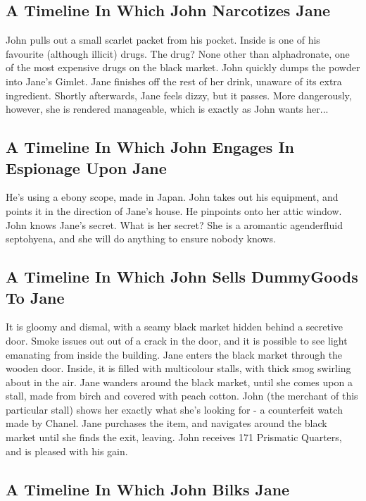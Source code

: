 \documentclass{article}
\begin{document}
\subsection{A Timeline In Which John Narcotizes Jane}


John pulls out a small scarlet packet from his pocket. Inside is one of his favourite (although illicit) drugs.
The drug? None other than alphadronate, one of the most expensive drugs on the black market.
John quickly dumps the powder into Jane's Gimlet.
Jane finishes off the rest of her drink, unaware of its extra ingredient.
Shortly afterwards, Jane feels dizzy, but it passes.
More dangerously, however, she is rendered manageable, which is exactly as John wants her...
\subsection{A Timeline In Which John Engages In Espionage Upon Jane}


He's using a ebony scope, made in Japan.
John takes out his equipment, and points it in the direction of Jane's house. He pinpoints onto her attic window.
John knows Jane's secret. What is her secret? She is a aromantic agenderfluid septohyena, and she will do anything to ensure nobody knows.
\subsection{A Timeline In Which John Sells DummyGoods To Jane}


It is gloomy and dismal, with a seamy black market hidden behind a secretive door.
Smoke issues out out of a crack in the door, and it is possible to see light emanating from inside the building.
Jane enters the black market through the wooden door.
Inside, it is filled with multicolour stalls, with thick smog swirling about in the air.
Jane wanders around the black market, until she comes upon a stall, made from birch and covered with peach cotton.
John (the merchant of this particular stall) shows her exactly what she's looking for {-} a counterfeit watch made by Chanel.
Jane purchases the item, and navigates around the black market until she finds the exit, leaving.
John receives 171 Prismatic Quarters, and is pleased with his gain.
\subsection{A Timeline In Which John Bilks Jane}
\end{document}
